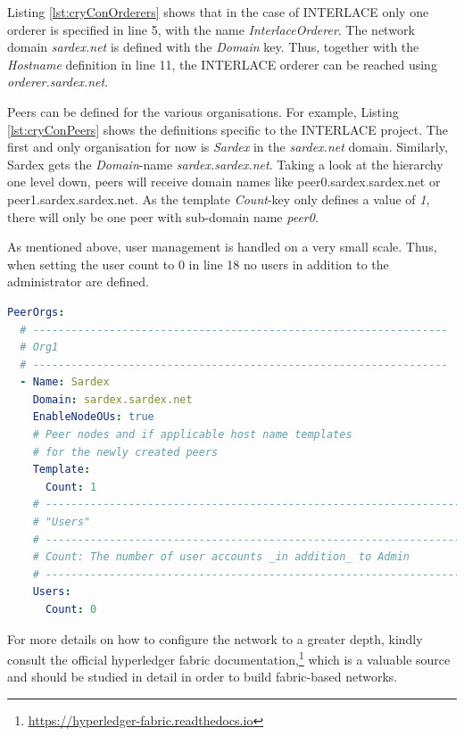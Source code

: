 Listing \ref{lst:cryConOrderers} shows that in the case of INTERLACE only one orderer is specified in line 5, with the name \textit{InterlaceOrderer}. The network domain \textit{sardex.net} is defined with the \textit{Domain} key. Thus, together with the \textit{Hostname} definition in line 11, the INTERLACE orderer can be reached using \textit{orderer.sardex.net}.

Peers can be defined for the various organisations. For example, Listing \ref{lst:cryConPeers} shows the definitions specific to the INTERLACE project. The first and only organisation for now is \textit{Sardex} in the \textit{sardex.net} domain. Similarly, Sardex gets the \textit{Domain}-name \textit{sardex.sardex.net}. Taking a look at the hierarchy one level down, peers will receive domain names like peer0.sardex.sardex.net or peer1.sardex.sardex.net. As the template \textit{Count}-key only defines a value of \textit{1}, there will only be one peer with sub-domain name \textit{peer0}.

As mentioned above, user management is handled on a very small scale. Thus, when setting the user count to 0 in line 18 no users in addition to the administrator are defined.

\begin{center}
\begin{minipage}{0.8\textwidth}
\small
\begin{lstlisting}[language=yaml,firstnumber=1,caption={\bf\small crypto-config.yaml excerpt - Peer(s) definition}, captionpos=b,label=lst:cryConPeers]
PeerOrgs:
  # -----------------------------------------------------------------
  # Org1
  # -----------------------------------------------------------------
  - Name: Sardex
    Domain: sardex.sardex.net
    EnableNodeOUs: true
    # Peer nodes and if applicable host name templates
    # for the newly created peers
    Template:
      Count: 1
    # -----------------------------------------------------------------
    # "Users"
    # -----------------------------------------------------------------
    # Count: The number of user accounts _in addition_ to Admin
    # -----------------------------------------------------------------
    Users:
      Count: 0
\end{lstlisting}
\end{minipage}
\end{center}

For more details on how to configure the network to a greater depth, kindly consult the official hyperledger fabric documentation,\footnote{\url{https://hyperledger-fabric.readthedocs.io}} which is a valuable source and should be studied in detail in order to build fabric-based networks.

